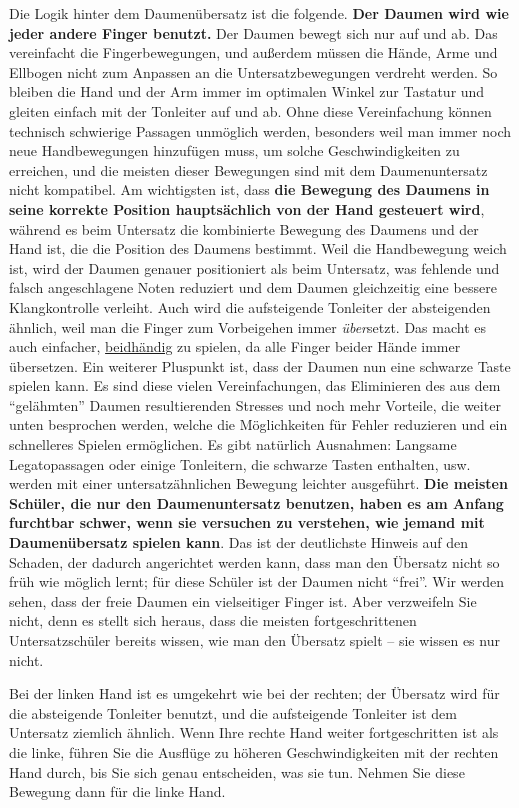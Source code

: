 Die Logik hinter dem Daumenübersatz ist die folgende.
\textbf{Der Daumen wird wie jeder andere Finger benutzt.}
Der Daumen bewegt sich nur auf und ab.
Das vereinfacht die Fingerbewegungen, und außerdem müssen die Hände, Arme und Ellbogen nicht zum Anpassen an die Untersatzbewegungen verdreht werden.
So bleiben die Hand und der Arm immer im optimalen Winkel zur Tastatur und gleiten einfach mit der Tonleiter auf und ab.
Ohne diese Vereinfachung können technisch schwierige Passagen unmöglich werden, besonders weil man immer noch neue Handbewegungen hinzufügen muss, um solche Geschwindigkeiten zu erreichen, und die meisten dieser Bewegungen sind mit dem Daumenuntersatz nicht kompatibel.
Am wichtigsten ist, dass \textbf{die Bewegung des Daumens in seine korrekte Position hauptsächlich von der Hand gesteuert wird}, während es beim Untersatz die kombinierte Bewegung des Daumens und der Hand ist, die die Position des Daumens bestimmt.
Weil die Handbewegung weich ist, wird der Daumen genauer positioniert als beim Untersatz, was fehlende und falsch angeschlagene Noten reduziert und dem Daumen gleichzeitig eine bessere Klangkontrolle verleiht.
Auch wird die aufsteigende Tonleiter der absteigenden ähnlich, weil man die Finger zum Vorbeigehen immer \textit{über}setzt.
Das macht es auch einfacher, \hyperref[c1ii25]{beidhändig} zu spielen, da alle Finger beider Hände immer übersetzen.
Ein weiterer Pluspunkt ist, dass der Daumen nun eine schwarze Taste spielen kann.
Es sind diese vielen Vereinfachungen, das Eliminieren des aus dem \enquote{gelähmten} Daumen resultierenden Stresses und noch mehr Vorteile, die weiter unten besprochen werden, welche die Möglichkeiten für Fehler reduzieren und ein schnelleres Spielen ermöglichen.
Es gibt natürlich Ausnahmen: Langsame Legatopassagen oder einige Tonleitern, die schwarze Tasten enthalten, usw. werden mit einer untersatzähnlichen Bewegung leichter ausgeführt.
\textbf{Die meisten Schüler, die nur den Daumenuntersatz benutzen, haben es am Anfang furchtbar schwer, wenn sie versuchen zu verstehen, wie jemand mit Daumenübersatz spielen kann}.
Das ist der deutlichste Hinweis auf den Schaden, der dadurch angerichtet werden kann, dass man den Übersatz nicht so früh wie möglich lernt; für diese Schüler ist der Daumen nicht \enquote{frei}.
Wir werden sehen, dass der freie Daumen ein vielseitiger Finger ist.
Aber verzweifeln Sie nicht, denn es stellt sich heraus, dass die meisten fortgeschrittenen Untersatzschüler bereits wissen, wie man den Übersatz spielt -- sie wissen es nur nicht.

Bei der linken Hand ist es umgekehrt wie bei der rechten; der Übersatz wird für die absteigende Tonleiter benutzt, und die aufsteigende Tonleiter ist dem Untersatz ziemlich ähnlich.
Wenn Ihre rechte Hand weiter fortgeschritten ist als die linke, führen Sie die Ausflüge zu höheren Geschwindigkeiten mit der rechten Hand durch, bis Sie sich genau entscheiden, was sie tun.
Nehmen Sie diese Bewegung dann für die linke Hand.

